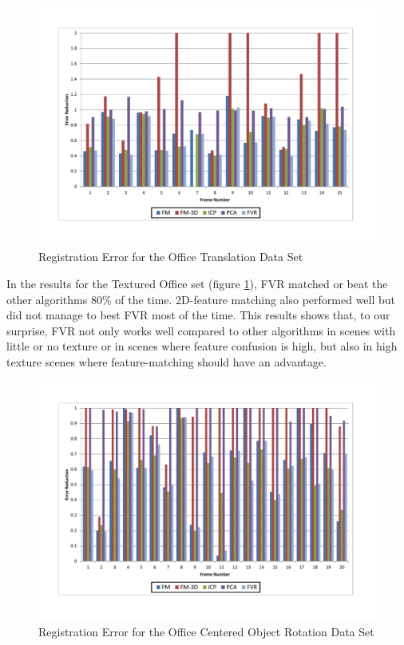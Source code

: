 \begin{figure}[t]
\centering
\includegraphics[width=6.0in]{images/results/Office_TexturedItems_Translation}
\caption{Registration Error for the Office Translation Data Set}
\label{fig:PET8}
\end{figure}

In the results for the Textured Office set (figure \ref{fig:PET8}), FVR matched or beat the other algorithms 80\% of the time. 2D-feature matching also performed well but did not manage to best FVR most of the time. This results shows that, to our surprise, FVR not only works well compared to other algorithms in scenes with little or no texture or in scenes where feature confusion is high, but also in high texture scenes where feature-matching should have an advantage.


\begin{figure}[t]
\centering
\includegraphics[width=6.0in]{images/results/Office_Texture_blind_spot_rotation}
\caption{Registration Error for the Office Centered Object Rotation Data Set}
\label{fig:PET9}
\end{figure}


